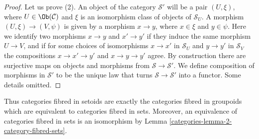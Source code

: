 \begin{proof}
Let us prove (2).
An object of the category $\mathcal{S}'$ will be a pair $(U, \xi)$, where
$U \in \Ob(\mathcal{C})$ and $\xi$ is an isomorphism class of objects
of $\mathcal{S}_U$. A morphism $(U, \xi) \to (V , \psi)$ is given by a
morphism $x \to y$, where $x \in \xi$ and $y \in \psi$. Here we identify
two morphisms $x \to y$ and $x' \to y'$ if they induce the same morphism
$U \to V$, and if for some choices of isomorphisms $x \to x'$ in
$\mathcal{S}_U$ and $y \to y'$ in $\mathcal{S}_V$ the compositions
$x \to x' \to y'$ and $x \to y \to y'$ agree. By construction there are
surjective maps on objects and morphisms from $\mathcal{S} \to
\mathcal{S}'$. We define composition of morphisms in $\mathcal{S}'$ to
be the unique law that turns $\mathcal{S} \to \mathcal{S}'$ into a functor.
Some details omitted.
\end{proof}

Thus categories fibred in setoids are exactly the categories fibred
in groupoids which are equivalent to categories fibred in sets.
Moreover, an equivalence of categories fibred in sets is an isomorphism
by Lemma \ref{categories-lemma-2-category-fibred-sets}.

